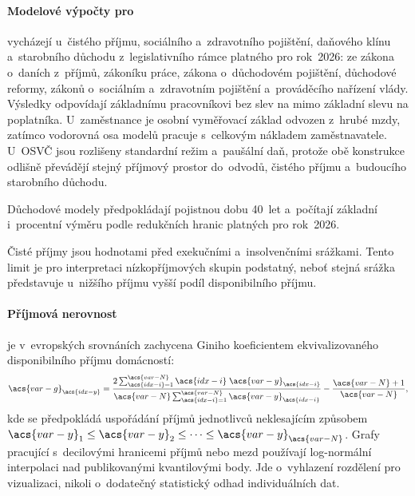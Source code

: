 \paragraph{Modelové výpočty pro }\label{par:cz_model} vycházejí u~čistého příjmu, sociálního a~zdravotního pojištění, daňového klínu
a~starobního důchodu z~legislativního rámce  platného pro
rok~2026: ze zákona o~daních z~příjmů, zákoníku práce, zákona o~důchodovém
pojištění, důchodové reformy, zákonů o~sociálním a~zdravotním pojištění
a~prováděcího nařízení vlády.
Výsledky odpovídají základnímu pracovníkovi bez slev na  mimo základní slevu na
poplatníka. U~zaměstnance je osobní vyměřovací základ odvozen z~hrubé mzdy,
zatímco vodorovná osa modelů pracuje s~celkovým nákladem zaměstnavatele. U~\acs{OSVČ}
jsou rozlišeny standardní režim a~paušální daň, protože obě konstrukce odlišně
převádějí stejný příjmový prostor do~odvodů, čistého příjmu a~budoucího starobního
důchodu.\par

Důchodové modely předpokládají pojistnou dobu 40~let a~počítají základní
i~procentní výměru podle redukčních hranic platných pro rok~2026.\par
Čisté příjmy
jsou hodnotami před exekučními a~insolvenčními srážkami. Tento limit je pro
interpretaci nízkopříjmových skupin podstatný, neboť stejná srážka
představuje u~nižšího příjmu vyšší podíl disponibilního příjmu.~\cite{PAQ_ChudobaCEEU_2025}\par

\paragraph{Příjmová nerovnost}\label{par:gini_y_sec} je v~evropských srovnáních zachycena Giniho koeficientem
ekvivalizovaného disponibilního příjmu domácností:
\begin{equation}
  \acs{var-g}_{\acs{idx-y}}
    = \frac{2\sum_{\acs{idx-i}=1}^{\acs{var-N}}
              \acs{idx-i}\;\acs{var-y}_{\acs{idx-i}}}
           {\acs{var-N}\sum_{\acs{idx-i}=1}^{\acs{var-N}}
              \acs{var-y}_{\acs{idx-i}}}
    - \frac{\acs{var-N}+1}{\acs{var-N}},
  \label{eq:gini_y}
\end{equation}
kde se předpokládá uspořádání příjmů jednotlivců neklesajícím způsobem \(\acs{var-y}_1 \le \acs{var-y}_2 \le \dots \le \acs{var-y}_{\acs{var-N}}\). Grafy pracující s~decilovými hranicemi příjmů nebo mezd používají log-normální
interpolaci nad publikovanými kvantilovými body. Jde o~vyhlazení rozdělení pro vizualizaci,
nikoli o~dodatečný statistický odhad individuálních dat.\par

